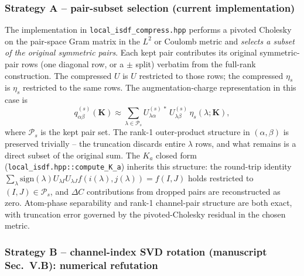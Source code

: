 \documentclass[aps,prb,reprint,superscriptaddress,nofootinbib]{revtex4-2}
\begin{document}
\subsubsection{Strategy A -- pair-subset selection (current implementation)}

The implementation in \texttt{local\_isdf\_compress.hpp} performs a
pivoted Cholesky on the pair-space Gram matrix in the \(L^2\) or
Coulomb metric and \emph{selects a subset of the original symmetric
pairs}.  Each kept pair contributes its original symmetric-pair rows
(one diagonal row, or a \(\pm\) split) verbatim from the full-rank
construction.  The compressed \(U\) is \(U\) restricted to those rows;
the compressed \(\eta_s\) is \(\eta_s\) restricted to the same rows.
The augmentation-charge representation in this case is
\begin{equation}
q^{(s)}_{\alpha\beta}(\mathbf K)
\approx
\sum_{\lambda\in\mathcal P_s}
U^{(s)\,*}_{\lambda\alpha}\,U^{(s)}_{\lambda\beta}\,
\eta_s(\lambda;\mathbf K),
\label{eq:Qhat-subset}
\end{equation}
where \(\mathcal P_s\) is the kept pair set.  The rank-1 outer-product
structure in \((\alpha,\beta)\) is preserved trivially -- the truncation
discards entire \(\lambda\) rows, and what remains is a direct subset
of the original sum.  The \(K_a\) closed form
(\texttt{local\_isdf.hpp::compute\_K\_a}) inherits this structure: the
round-trip identity
\(\sum_\lambda \mathrm{sign}(\lambda)U_{\lambda I}U_{\lambda J} f(i(\lambda),j(\lambda))=f(I,J)\)
holds restricted to \((I,J)\in\mathcal P_s\), and \(\Delta C\)
contributions from dropped pairs are reconstructed as zero.
Atom-phase separability and rank-1 channel-pair structure are both
exact, with truncation error governed by the pivoted-Cholesky residual
in the chosen metric.

\subsubsection{Strategy B -- channel-index SVD rotation
(manuscript Sec.~V.B): numerical refutation}
\end{document}
